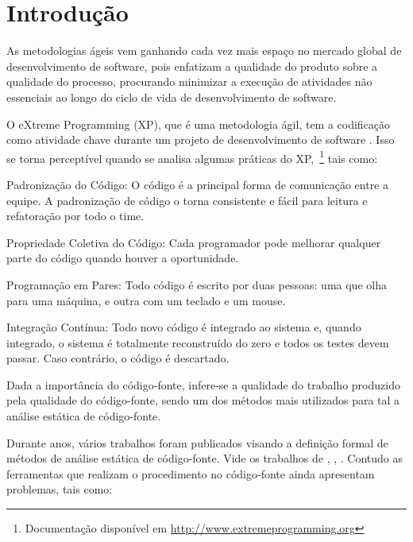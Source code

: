\chapter{Introdução}

As metodologias ágeis vem ganhando cada vez mais espaço no mercado global 
de desenvolvimento de software, pois enfatizam a qualidade do produto 
sobre a qualidade do processo, procurando minimizar a execução 
de atividades não essenciais ao longo do ciclo de vida de 
desenvolvimento de software. 

O eXtreme Programming (XP), que é uma metodologia ágil, tem a codificação como 
atividade chave durante um projeto de desenvolvimento de software 
\cite{beck1999}. Isso se torna perceptível quando se analisa algumas práticas do 
XP,~\footnote{Documentação disponível em \url{http://www.extremeprogramming.org}}
tais como:



\begin{pratices}
\item Padronização do Código: O código é a principal forma de comunicação entre 
a equipe. A padronização de código o torna consistente e fácil para leitura e 
refatoração por todo o time. 
\item Propriedade Coletiva do Código: Cada programador pode melhorar qualquer 
parte do código quando houver a oportunidade.
\item Programação em Pares: Todo código é escrito por duas pessoas: uma que olha 
para uma máquina, e outra com um teclado e um mouse.
\item Integração Contínua: Todo novo código é integrado ao sistema e, quando 
integrado, o sistema é totalmente reconstruído do zero e todos os testes devem 
passar. Caso contrário, o código é descartado.

\end{pratices} 

Dada a importância do código-fonte, infere-se a qualidade do trabalho produzido 
pela qualidade do código-fonte, sendo um dos métodos mais utilizados
para tal a análise estática de código-fonte. 

Durante anos, vários trabalhos foram publicados visando a definição formal de 
métodos de análise estática de código-fonte. Vide os trabalhos de 
, , .
Contudo as ferramentas que realizam o procedimento no código-fonte ainda 
apresentam problemas, tais como:

